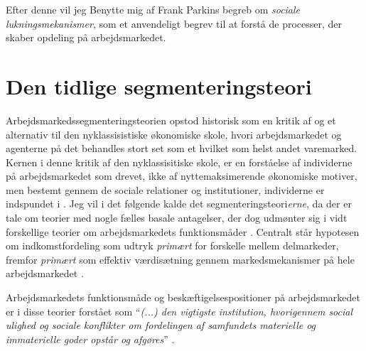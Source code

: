 Efter denne vil jeg Benytte mig af Frank Parkins begreb om \emph{sociale lukningsmekanismer}, som et anvendeligt begrev til at forstå de processer, der skaber opdeling på arbejdsmarkedet. 





\section{Den tidlige segmenteringsteori \label{AST_overordnet}}

Arbejdsmarkedssegmenteringsteorien opstod historisk som en kritik af og et alternativ til den nyklassisistiske økonomiske skole, hvori arbejdsmarkedet og agenterne på det behandles stort set som et hvilket som helst andet varemarked. Kernen i denne kritik af den nyklassisitiske skole, er en forståelse af individerne på arbejdsmarkedet som drevet, ikke af nyttemaksimerende økonomiske motiver, men bestemt gennem de sociale relationer og institutioner, individerne er indspundet i \parencite[173]{Boje1986}. Jeg vil i det følgende kalde det segmenteringsteori\emph{erne}, da der er tale om teorier med nogle fælles basale antagelser, der dog udmønter sig i vidt forskellige teorier om arbejdsmarkedets funktionsmåder \parencite[177]{Edwards1979}.  Centralt står hypotesen om indkomstfordeling som udtryk \emph{primært} for forskelle mellem delmarkeder, fremfor \emph{primært} som effektiv værdisætning gennem markedsmekanismer på hele arbejdsmarkedet \parencite[78]{BojeToft1989}.

Arbejdsmarkedets funktionsmåde og beskæftigelsespositioner på arbejdsmarkedet er i disse teorier forstået som “\emph{(...) den vigtigste institution, hvorigennem social ulighed og sociale konflikter om fordelingen af samfundets materielle og immaterielle goder opstår og afgøres}” \parencite[10]{Boje1985}. 

